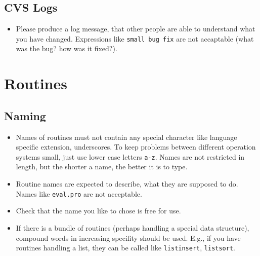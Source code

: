 \documentclass[12pt]{article}
\begin{document}
\subsection{CVS Logs}
\begin{itemize}
\item Please produce a log message, that other people are able to understand what you have changed. Expressions like \texttt{small bug fix} are not accaptable (what was the bug? how was it fixed?).  
\end{itemize}




\section{Routines}
\subsection{Naming}
\begin{itemize}
\item Names of routines must not contain any special character like language specific extension, underscores. To keep problems between different operation systems small, just use lower case letters \texttt{a-z}. Names are not restricted in length, but the shorter a name, the better it is to type.  
\item Routine names are expected to describe, what they are supposed to do. Names like \texttt{eval.pro} are not acceptable.
\item Check that the name you like to chose is free for use.
\item If there is a bundle of routines (perhaps handling a special data structure), compound words in increasing specifity should be used. E.g., if you have routines handling a list, they can be called like \texttt{listinsert}, \texttt{listsort}.
\end{itemize}
\end{document}
